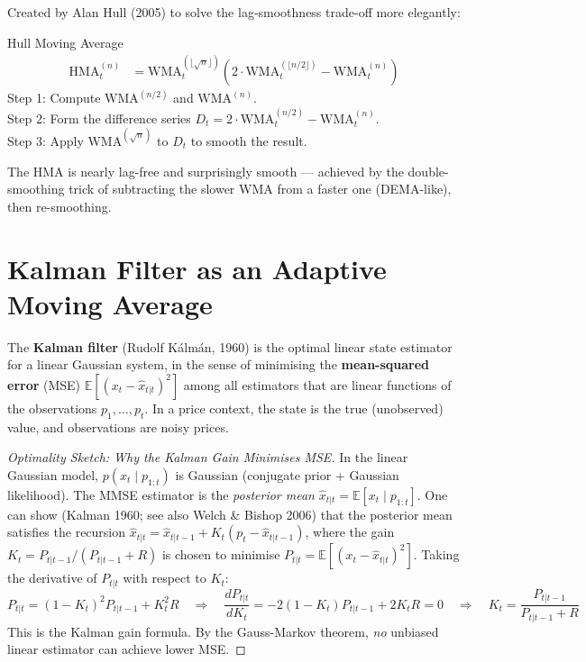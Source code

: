 \documentclass[12pt,a4paper,openany]{report}
\theoremstyle{definition}
\newcommand{\E}{\mathbb{E}}
\begin{document}
Created by Alan Hull (2005) to solve the lag-smoothness trade-off more elegantly:

\begin{definitionbox}{Hull Moving Average}
\begin{align*}
  \text{HMA}_t^{(n)} &= \text{WMA}_{t}^{(\lfloor\sqrt{n}\rfloor)}\!\left( 2 \cdot \text{WMA}_t^{(\lfloor n/2 \rfloor)} - \text{WMA}_t^{(n)} \right)
\end{align*}
Step 1: Compute $\text{WMA}^{(n/2)}$ and $\text{WMA}^{(n)}$. \\
Step 2: Form the difference series $D_t = 2\cdot\text{WMA}^{(n/2)}_t - \text{WMA}^{(n)}_t$. \\
Step 3: Apply $\text{WMA}^{(\sqrt{n})}$ to $D_t$ to smooth the result.
\end{definitionbox}

The HMA is nearly lag-free and surprisingly smooth — achieved by the double-smoothing trick of subtracting the slower WMA from a faster one (DEMA-like), then re-smoothing.

\section{Kalman Filter as an Adaptive Moving Average}

The \textbf{Kalman filter} (Rudolf Kálmán, 1960) is the optimal linear state estimator for a linear Gaussian system, in the sense of minimising the \textbf{mean-squared error} (MSE) $\E[(x_t - \hat{x}_{t|t})^2]$ among all estimators that are linear functions of the observations $p_1, \ldots, p_t$. In a price context, the state is the true (unobserved) value, and observations are noisy prices.

\begin{proof}[Optimality Sketch: Why the Kalman Gain Minimises MSE]
In the linear Gaussian model, $p(x_t \mid p_{1:t})$ is Gaussian (conjugate prior + Gaussian likelihood). The MMSE estimator is the \emph{posterior mean} $\hat{x}_{t|t} = \E[x_t \mid p_{1:t}]$. One can show (Kalman 1960; see also Welch \& Bishop 2006) that the posterior mean satisfies the recursion $\hat{x}_{t|t} = \hat{x}_{t|t-1} + K_t(p_t - \hat{x}_{t|t-1})$, where the gain $K_t = P_{t|t-1}/(P_{t|t-1}+R)$ is chosen to minimise $P_{t|t} = \E[(x_t-\hat{x}_{t|t})^2]$. Taking the derivative of $P_{t|t}$ with respect to $K_t$:
\[
  P_{t|t} = (1-K_t)^2 P_{t|t-1} + K_t^2 R
  \quad\Rightarrow\quad \frac{dP_{t|t}}{dK_t} = -2(1-K_t)P_{t|t-1} + 2K_t R = 0
  \quad\Rightarrow\quad K_t = \frac{P_{t|t-1}}{P_{t|t-1}+R}
\]
This is the Kalman gain formula. By the Gauss-Markov theorem, \emph{no} unbiased linear estimator can achieve lower MSE.
\end{proof}
\end{document}

